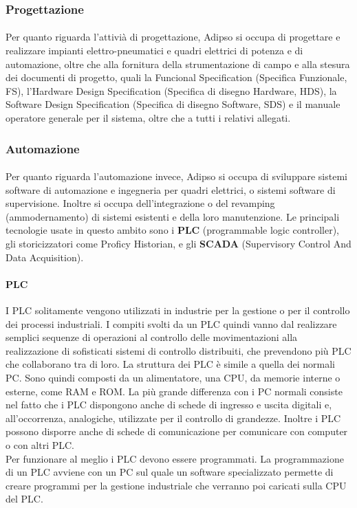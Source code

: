   \subsubsection{Progettazione}
  \paragraph{}
  Per quanto riguarda l'attivià di progettazione, Adipso si occupa di progettare e realizzare impianti 
  elettro-pneumatici e quadri elettrici di potenza e di automazione, oltre che alla fornitura della
  strumentazione di campo e alla stesura dei documenti di progetto, quali la Funcional Specification (Specifica 
  Funzionale, FS), l'Hardware Design Specification (Specifica di disegno Hardware, HDS), la Software Design 
  Specification (Specifica di disegno Software, SDS) e il manuale operatore generale per il sistema, oltre che 
  a tutti i relativi allegati.  
  \subsubsection{Automazione}
  \paragraph{}
  Per quanto riguarda l'automazione invece, Adipso si occupa di sviluppare sistemi software di automazione e ingegneria 
  per quadri elettrici, o sistemi software di supervisione. Inoltre si occupa dell'integrazione o del 
  revamping (ammodernamento) di sistemi esistenti e della loro manutenzione. Le principali tecnologie usate 
  in questo ambito sono i \textbf{PLC} (programmable logic controller), gli storicizzatori come Proficy Historian, e 
  gli \textbf{SCADA} (Supervisory Control And Data Acquisition).
  \paragraph{PLC}
  I PLC solitamente vengono utilizzati in industrie per la gestione o per il controllo dei processi industriali.
  I compiti svolti da un PLC quindi vanno dal realizzare semplici sequenze di operazioni al controllo delle 
  movimentazioni alla realizzazione di sofisticati sistemi di controllo distribuiti, che prevendono più PLC 
  che collaborano tra di loro.
  La struttura dei PLC è simile a quella dei normali PC. Sono quindi composti da un alimentatore, una CPU, da 
  memorie interne o esterne, come RAM e ROM. La più grande differenza con i PC normali consiste nel fatto che i PLC 
  dispongono anche di schede di ingresso e uscita digitali e, all'occorrenza, analogiche, utilizzate per il controllo 
  di grandezze. Inoltre i PLC possono disporre anche di schede di comunicazione per comunicare con computer o con altri PLC.\\
  Per funzionare al meglio i PLC devono essere programmati. La programmazione di un PLC avviene con un PC sul quale 
  un software specializzato permette di creare programmi per la gestione industriale che verranno poi caricati sulla CPU del PLC. 
